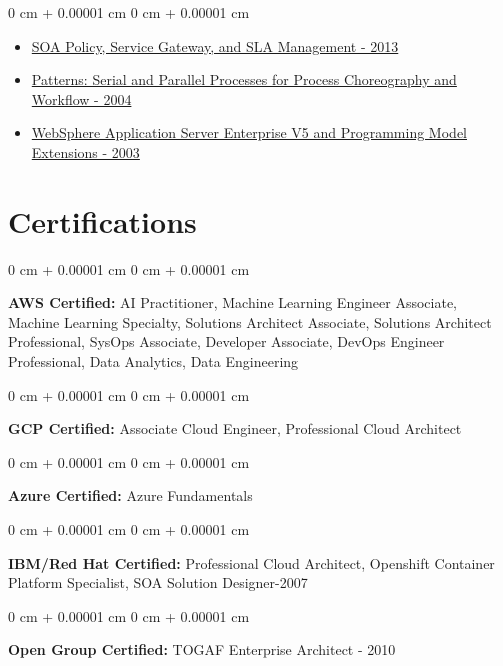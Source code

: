 \documentclass[10pt, letterpaper]{article}
\newenvironment{highlights}{
    \begin{itemize}[
        topsep=0.10 cm,
        parsep=0.10 cm,
        partopsep=0pt,
        itemsep=0pt,
        leftmargin=0 cm + 10pt
    ]
}{
    \end{itemize}
} %
\newenvironment{onecolentry}{
    \begin{adjustwidth}{
        0 cm + 0.00001 cm
    }{
        0 cm + 0.00001 cm
    }
}{
    \end{adjustwidth}
} %
\begin{document}
        \begin{onecolentry}
            \begin{highlights}
                \item \href{http://www.redbooks.ibm.com/abstracts/sg248101.html?Open}{SOA Policy, Service Gateway, and SLA Management - 2013}
                \item \href{https://www.oreilly.com/library/view/patterns-serial-and/0738498149/}{Patterns: Serial and Parallel Processes for Process Choreography and Workflow - 2004}
                \item \href{https://peterkovari.blog/wp-content/uploads/WebSphere-Application-Server-Enterprise-V5-and-Programming-Model-Extensions-sg246932.pdf}{WebSphere Application Server Enterprise V5 and Programming Model Extensions - 2003}
            \end{highlights}
        \end{onecolentry}


        \section{Certifications}
        
        \begin{onecolentry}
            \textbf{AWS Certified:} AI Practitioner, Machine Learning Engineer Associate, Machine Learning Specialty, Solutions Architect Associate, Solutions Architect Professional, SysOps Associate, Developer Associate, DevOps Engineer Professional, Data Analytics, Data Engineering 
        \end{onecolentry}

        \begin{onecolentry}
            \textbf{GCP Certified:} Associate Cloud Engineer, Professional Cloud Architect
        \end{onecolentry}

        \begin{onecolentry}
            \textbf{Azure Certified:} Azure Fundamentals
        \end{onecolentry}

        \begin{onecolentry}
            \textbf{IBM/Red Hat Certified:} Professional Cloud Architect, Openshift Container Platform Specialist, SOA Solution Designer-2007
        \end{onecolentry}

        \begin{onecolentry}
            \textbf{Open Group Certified:} TOGAF Enterprise Architect - 2010
        \end{onecolentry}
\end{document}
